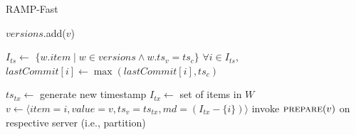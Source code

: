 \begin{algorithm}[t!]
\small
\caption{RAMP-Fast}
\label{alg:rapl}
\newcommand{\myindent}{\hspace{-1em}}

\begin{algorithmic}[1]
\vspace{.5em}

\vspace{.25em}

\label{rapl-beginprepare-server}
  \State $versions$.add($v$)\label{rapl-server-prepare}
  \State \Return
\EndProcedure\vspace{.5em}\label{rapl-endprepare-server}

\label{rapl-begincommit-server}
  \State $I_{ts} \gets$ $\{w.item \mid w \in versions \wedge w.ts_v = ts_c\}$\label{rapl-server-commit-1}
  \State $\forall i \in I_{ts}$, $lastCommit[i] \gets
  \max(lastCommit[i], ts_c)$\label{rapl-server-commit-2}
\EndProcedure\vspace{.5em}\label{rapl-endcommit-server}

\label{rapl-get-server-start}
  \Else 
  \EndIf
\EndProcedure\label{rapl-get-server-end}
\Statex\hrulefill\vspace{.25em}

\vspace{.25em}

\label{rapl-putall-start}
  \State $ts_{tx} \gets$ generate new timestamp\label{rapl-newid}
  \State $I_{tx} \gets $ set of items in $W$\label{rapl-metadata}
  \label{rapl-beginprepare-client}
  \State $v \gets \langle item=i, value=v, ts_v=ts_{tx}, md=(I_{tx} - \{i\})\rangle$\label{rapl-prepare-data}
  \State\hspace{1em} invoke $\textsc{prepare}(v)$ on respective server (i.e., partition)\label{rapl-prepare-client}
  \EndParFor\label{rapl-endprepare-client}
  

\end{algorithmic}
\end{algorithm}
